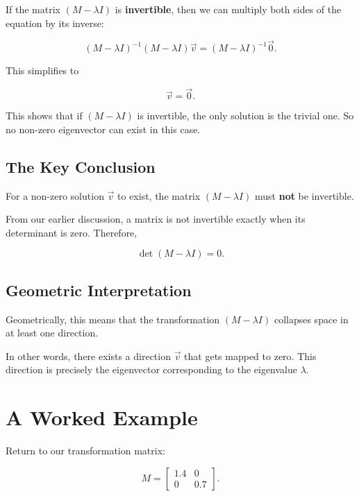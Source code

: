 \documentclass[11pt,openany]{book}
\theoremstyle{definition}
\begin{document}
If the matrix $(M - \lambda I)$ is \textbf{invertible}, then we can multiply both sides of the equation by its inverse:

\[
(M - \lambda I)^{-1}(M - \lambda I)\vec{v} = (M - \lambda I)^{-1}\vec{0}.
\]

This simplifies to

\[
\vec{v} = \vec{0}.
\]

\medskip

This shows that if $(M - \lambda I)$ is invertible, the only solution is the trivial one. 
So no non-zero eigenvector can exist in this case.

\medskip

\subsection{The Key Conclusion}

For a non-zero solution $\vec{v}$ to exist, the matrix $(M - \lambda I)$ must \textbf{not} be invertible.

\medskip

From our earlier discussion, a matrix is not invertible exactly when its determinant is zero. Therefore,

\[
\det(M - \lambda I) = 0.
\]

\medskip

\subsection{Geometric Interpretation}

Geometrically, this means that the transformation $(M - \lambda I)$ collapses space in at least one direction.

\medskip

In other words, there exists a direction $\vec{v}$ that gets mapped to zero. 
This direction is precisely the eigenvector corresponding to the eigenvalue $\lambda$.

\section{A Worked Example}

Return to our transformation matrix:

\[
M = \begin{bmatrix} 1.4 & 0 \\ 0 & 0.7 \end{bmatrix}.
\]
\end{document}
